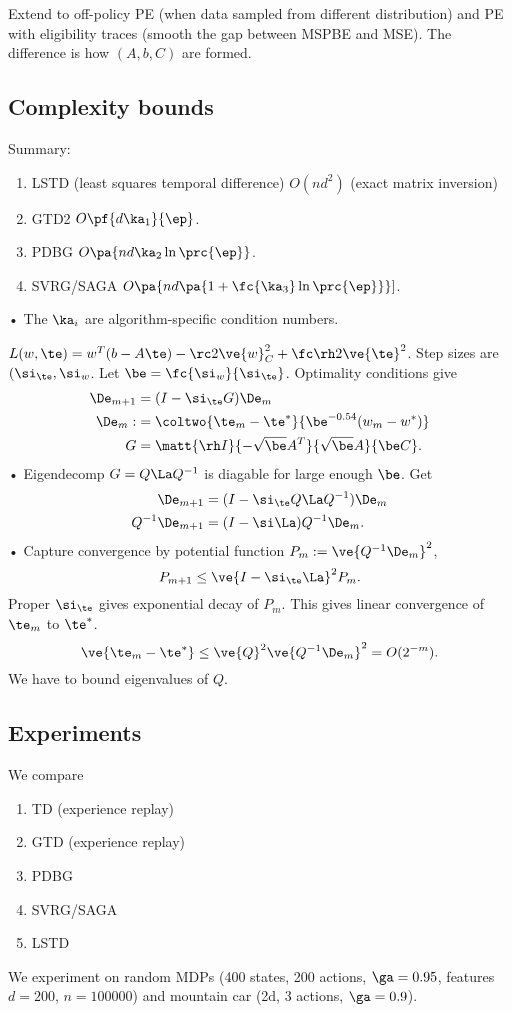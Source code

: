 Extend to off-policy PE (when data sampled from different distribution) and PE with eligibility traces (smooth the gap between MSPBE and MSE).  The difference is how $(A,b,C)$ are formed.

\subsection{Complexity bounds}

Summary:
\begin{enumerate}
\item
LSTD (least squares temporal difference) $O(nd^2)$ (exact matrix inversion)
\item
GTD2 $O\pf{d\ka_1}{\ep}$. 
\item
PDBG $O\pa{nd\ka_2\ln \prc{\ep}}$.
\item
SVRG/SAGA $O\pa{nd\pa{1+\fc{\ka_3}\ln \prc{\ep}}}]$.
\end{enumerate}•
The $\ka_i$ are algorithm-specific condition numbers. 

$L(w,\te) = w^T(b-A\te) -\rc 2\ve{w}_C^2 + \fc \rh2 \ve{\te}^2$. Step sizes are $(\si_\te, \si_w$. Let $\be = \fc{\si_w}{\si_\te}$. Optimality conditions give
\begin{align}
\De_{m+1} &=(I-\si_\te G)\De_m\\
\De_m:&= \coltwo{\te_m-\te^*}{\be^{-0.54} (w_m-w^*)}\\
G&=\matt{\rh I}{-\sqrt \be A^T}{\sqrt \be A}{\be C}.
\end{align}•
Eigendecomp $G=Q\La Q^{-1}$ is diagable for large enough $\be$.
Get
\begin{align}
\De_{m+1} &= (I-\si_\te Q\La Q^{-1}) \De_m\\
Q^{-1} \De_{m+1} &= (I-\si \La) Q^{-1} \De_m.
\end{align}•
Capture convergence by potential function $P_m:=\ve{Q^{-1}\De_m}^2$, 
$$
P_{m+1} \le \ve{I-\si_\te\La}^2 P_m.
$$
Proper $\si_\te$ gives exponential decay of $P_m$. This gives linear convergence of $\te_m$ to $\te^*$.
$$
\ve{\te_m-\te^*} \le \ve{Q}^2 \ve{Q^{-1}\De_m}^2 = O(2^{-m}).
$$
We have to bound eigenvalues of $Q$.
\subsection{Experiments}

We compare
\begin{enumerate}
\item
TD (experience replay)
\item
GTD (experience replay)
\item
PDBG 
\item
SVRG/SAGA
\item
LSTD
\end{enumerate}
We experiment on random MDPs (400 states, 200 actions, $\ga=0.95$, features $d=200$, $n=100000$) and mountain car (2d, 3 actions, $\ga=0.9$).

